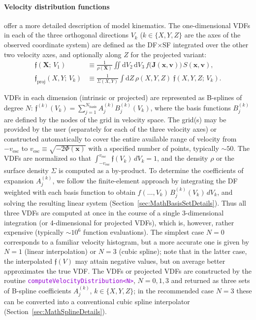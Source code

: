 \documentclass[12pt]{article}
\newcommand{\ttt}[1]{\textcolor{darkviolet}{\texttt{#1}}}
\renewcommand{\d}{\mathrm{d}}
\newcommand{\bv}{\boldsymbol{v}}
\newcommand{\bx}{\boldsymbol{x}}
\newcommand{\bX}{\boldsymbol{X}}
\newcommand{\bJ}{\boldsymbol{J}}
\begin{document}
\paragraph{Velocity distribution functions}  \label{sec:VDF} offer a more detailed description of model kinematics. The one-dimensional VDFs in each of the three orthogonal directions $V_k$ ($k\in\{X,Y,Z\}$ are the axes of the observed coordinate system) are defined as the DF$\times$SF integrated over the other two velocity axes, and optionally along $Z$ for the projected variant:
\begin{align*}
\mathfrak{f}(\bX;\,V_1) &\equiv \frac{1}{\rho(\bX)} \iint \d V_2\,\d V_3\, f\big(\bJ(\bx,\bv)\big)\,S(\bx,\bv) ,\\
\mathfrak{f}_\mathrm{proj}(X,Y;\,V_k) &\equiv \frac{1}{\Sigma(X,Y)} \int \d Z\, \rho(X,Y,Z)\;\mathfrak{f}(X,Y,Z;\,V_k) .
\end{align*}

VDFs in each dimension (intrinsic or projected) are represented as B-splines of degree $N$: $\mathfrak{f}^{(k)}(V_k) = \sum_{j=1}^{N_\mathrm{basis}} A_j^{(k)} B_j^{(k)}(V_k)$, where the basis functions $B_j^{(k)}$ are defined by the nodes of the grid in velocity space. The grid(s) may be provided by the user (separately for each of the three velocity axes) or constructed automatically to cover the entire available range of velocity from $-v_\mathrm{esc}$ to $v_\mathrm{esc}\equiv \sqrt{-2\Phi(\bx)}$ with a specified number of points, typically $\sim 50$. The VDFs are normalized so that $\int_{-v_\mathrm{esc}}^{v_\mathrm{esc}} \mathfrak{f}(V_k)\,dV_k = 1$, and the density $\rho$ or the surface density $\Sigma$ is computed as a by-product. To determine the coefficients of expansion $A_j^{(k)}$, we follow the finite-element approach by integrating the DF weighted with each basis function to obtain $f(\dots,V_k)\,B_j^{(k)}(V_k)\,dV_k$, and solving the resulting linear system (Section~\ref{sec:MathBasisSetDetails}). Thus all three VDFs are computed at once in the course of a single 3-dimensional integration (or 4-dimensional for projected VDFs), which is, however, rather expensive (typically $\sim 10^6$ function evaluations). The simplest case $N=0$ corresponds to a familiar velocity histogram, but a more accurate one is given by $N=1$ (linear interpolation) or $N=3$ (cubic spline); note that in the latter case, the interpolated $\mathfrak{f}(V)$ may attain negative values, but on average better approximates the true VDF.
The VDFs or projected VDFs are constructed by the routine \ttt{computeVelocityDistribution<N>}, $N=0,1,3$ and returned as three sets of B-spline coefficients $A_j^{(k)}$, $k\in\{X,Y,Z\}$; in the recommended case $N=3$ these can be converted into a conventional cubic spline interpolator (Section~\ref{sec:MathSplineDetails}).
\end{document}
